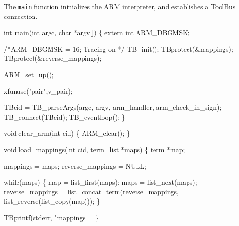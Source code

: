 

The {\tt main} function ininializes the ARM interpreter, and
establishes a ToolBus connection.

\nwenddocs{}\endmoddef\let\nwnotused=\nwoutput{}
int main(int argc, char *argv[])
\{
  extern int ARM_DBGMSK;

  /*ARM_DBGMSK = 16;  Tracing on */
  TB_init();
  TBprotect(&mappings);
  TBprotect(&reverse_mappings);

  ARM_set_up();

  xfunuse("pair",v_pair);

  TBcid = TB_parseArgs(argc, argv, arm_handler, arm_check_in_sign);
  TB_connect(TBcid);
  TB_eventloop();
\}
\nwendcode{}\nwdocspar



\nwenddocs{}\endmoddef\let\nwnotused=\nwoutput{}
void clear_arm(int cid)
\{
  ARM_clear();
\}
\nwendcode{}\nwdocspar


\nwenddocs{}\endmoddef\let\nwnotused=\nwoutput{}
void load_mappings(int cid, term_list *maps)
\{
  term *map;

  mappings = maps;
  reverse_mappings = NULL;

  while(maps) \{
    map = list_first(maps);
    maps = list_next(maps);
    reverse_mappings = list_concat_term(reverse_mappings, 
                                        list_reverse(list_copy(map)));
  \}

  TBprintf(stderr, "mappings = %
\}
\nwendcode{}\nwdocspar

